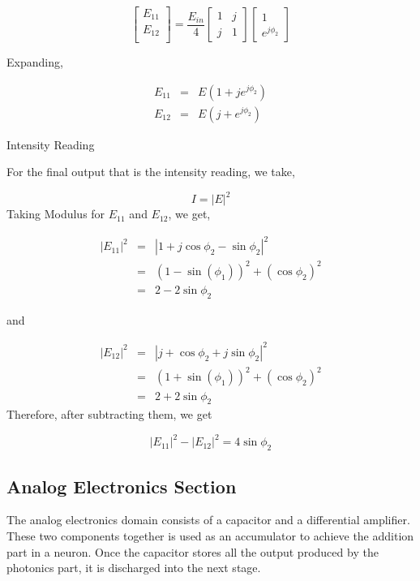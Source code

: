 $$
\begin{bmatrix}
E_{11} \\
E_{12} \\
\end{bmatrix} = \frac{E_{in}}{4} \begin{bmatrix}
1 & j \\
j & 1
\end{bmatrix}\begin{bmatrix}
1 \\
e^{j\phi_{2}}
\end{bmatrix}
$$

Expanding,

$$
\begin{aligned}
E_{11} &=& E(1+je^{j\phi_{2}})\\
E_{12} &=& E(j+e^{j\phi_{2}})
\end{aligned}
$$

 Intensity Reading

For the final output that is the intensity reading, we take,

$$
I = |E|^2
$$
Taking Modulus for $E_{11}$ and $E_{12}$, we get,

$$
\begin{aligned}
|E_{11}|^2 &=& |1 + j\cos\phi_{2} - \sin\phi_{2}|^2\\
&=& \left(1-\sin(\phi_{1})\right)^2 + (\cos{\phi_{2}})^2\\
&=& 2 - 2\sin\phi_{2}
\end{aligned}
$$

and 

$$
\begin{aligned}
|E_{12}|^2 &=& |j + \cos\phi_{2} + j\sin\phi_{2}|^2\\
&=& \left(1+\sin(\phi_{1})\right)^2 + (\cos{\phi_{2}})^2\\
&=& 2 + 2\sin\phi_{2}
\end{aligned}
$$
Therefore, after subtracting them, we get

$$
|E_{11}|^2 - |E_{12}|^2 = 4\sin\phi_{2}
$$



\subsection{Analog Electronics Section}

The analog electronics domain consists of a capacitor and a differential amplifier. These two components together is used as an accumulator to achieve the addition part in a neuron. Once the capacitor stores all the output produced by the photonics part, it is discharged into the next stage.

